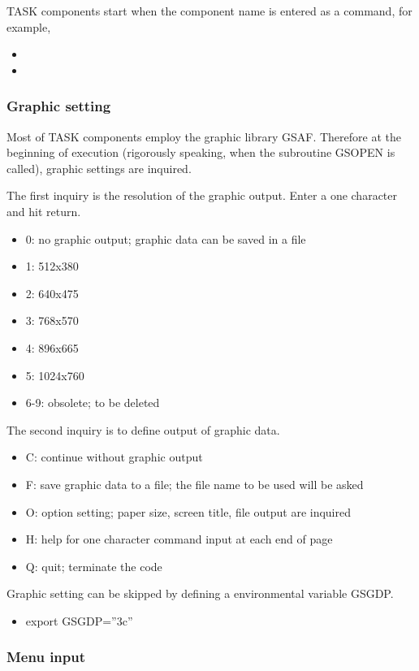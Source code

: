 \documentclass[11pt]{article}
\begin{document}
TASK components start when the component name is entered as a
command, for example, 
\begin{itemize}
\item[\qquad]
\item[\qquad]
\end{itemize}

\subsubsection{Graphic setting}

Most of TASK components employ the graphic library GSAF.  Therefore at
the beginning of execution (rigorously speaking, when the subroutine
GSOPEN is called), graphic settings are inquired. 

The first inquiry is the resolution of the graphic output. Enter a one
character and hit return.
\begin{itemize}
\item[]
0: no graphic output; graphic data can be saved in a file
\item[]
1: 512x380
\item[]
2: 640x475
\item[]
3: 768x570
\item[]
4: 896x665
\item[]
5: 1024x760
\item[]
6-9: obsolete; to be deleted
\end{itemize}

The second inquiry is to define output of graphic data.
\begin{itemize}
\item[]
C: continue without graphic output
\item[]
F: save graphic data to a file; the file name to be used will be asked
\item[]
O: option setting; paper size, screen title, file output are
inquired
\item[]
H: help for one character command input at each end of page
\item[]
Q: quit; terminate the code
\end{itemize}

Graphic setting can be skipped by defining a environmental variable
GSGDP.
\begin{itemize}
\item[]
export GSGDP=''3c''
\end{itemize}

\subsubsection{Menu input}
\end{document}
